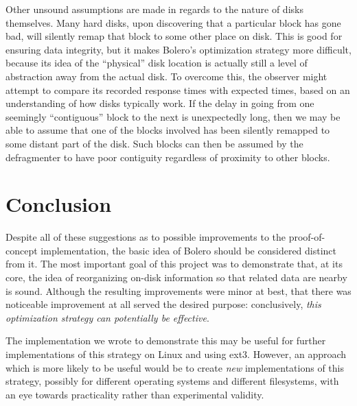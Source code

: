 \documentclass[10pt,twocolumn,letterpaper]{article}
\begin{document}
Other unsound assumptions are made in regards to the nature of disks themselves. Many hard disks, upon discovering that a particular block has gone bad, will silently remap that block to some other place on disk\cite{remapping}. This is good for ensuring data integrity, but it makes Bolero's optimization strategy more difficult, because
its idea of the ``physical'' disk location is actually still a level of abstraction away from
the actual disk. To overcome this, the observer might attempt to compare its recorded response
times with expected times, based on an understanding of how disks typically work.
If the delay in going from one seemingly ``contiguous'' block to the next
is unexpectedly long, then we may be able to assume that one of the blocks involved
has been silently remapped to some distant part of the disk. Such blocks can then be
assumed by the defragmenter to have poor contiguity regardless of proximity to other
blocks.

\section{Conclusion}

Despite all of these suggestions as to possible improvements to the proof-of-concept implementation, the basic idea of Bolero should be considered distinct from it. The most important goal of this project was to demonstrate that, at its core, the idea of reorganizing on-disk information so that related data are nearby is sound. Although the resulting improvements were minor at best, that there was noticeable improvement at all served the desired purpose: conclusively, \emph{this optimization strategy can potentially be effective}.

The implementation we wrote to demonstrate this may be useful for further implementations of this strategy on Linux and using ext3. However, an approach which is more likely to be useful would be to create \emph{new} implementations of this strategy, possibly for different operating systems and different filesystems, with an eye towards practicality rather than experimental validity.

{}

\end{document}
